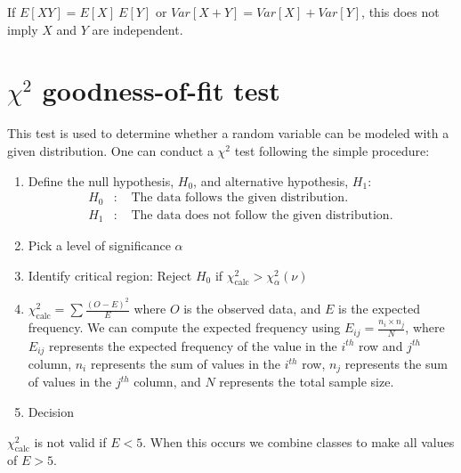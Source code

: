 \begin{note} \label{mod2:note:Independence:Non-implication}
	
	If $E[XY] = E[X] \ E[Y]$ or $Var[X + Y] = Var[X]+ Var[Y]$, this does not imply $X$ and $Y$ are independent.
	
\end{note}



\section{$\chi^2$ goodness-of-fit test} \label{Section:ChiSquareTest}
This test is used to determine whether a random variable can be modeled with a given distribution. One can conduct a $\chi^2$ test following the simple procedure:
\begin{enumerate}[label = \arabic*)]
	\item Define the null hypothesis, $H_0$, and alternative hypothesis, $H_1$:
	\begin{eqnarray}
		H_0&:& \text{ The data follows the given distribution.} \\
		H_1&:& \text{ The data does not follow the given distribution.} \
	\end{eqnarray}
	\item Pick a level of significance $\alpha$
	\item Identify critical region: Reject $H_0$ if $\chi^2_\text{calc} > \chi^2_\alpha (\nu)$ \
	
	\item $\chi^2_\text{calc} =\sum \frac{(O - E)^2}{E} $
	where $O$ is the observed data, and $E$ is the expected frequency. We can compute the expected frequency using $E_{ij} = \frac{n_i \times n_j}{N}$, where $E_{ij}$ represents the expected frequency of the value in the $i^{th}$ row and $j^{th}$ column, $n_i$ represents the sum of values in the $i^{th}$ row, $n_{j}$ represents the sum of values in the $j^{th}$ column, and $N$ represents the total sample size. 
	\item Decision
\end{enumerate}

\begin{note}
	$\chi^2_\text{calc}$ is not valid if $E < 5$. When this occurs we combine classes to make all values of $E>5$.
\end{note}

